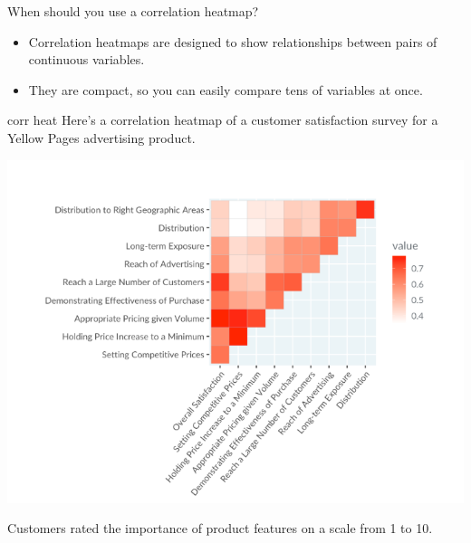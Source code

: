 \documentclass[
  ignorenonframetext,
]{beamer}
\begin{document}
\begin{frame}{When should you use a correlation heatmap?}
\label{when-should-you-use-a-correlation-heatmap}
\begin{itemize}
\item
  Correlation heatmaps are designed to show relationships between pairs
  of continuous variables.
\item
  They are compact, so you can easily compare tens of variables at once.
\end{itemize}
\end{frame}

\begin{frame}{corr heat}
\label{corr-heat}
Here's a correlation heatmap of a customer satisfaction survey for a
Yellow Pages advertising product.

\includegraphics{../images/im96.png}

Customers rated the importance of product features on a scale from 1 to
10.
\end{frame}
\end{document}

